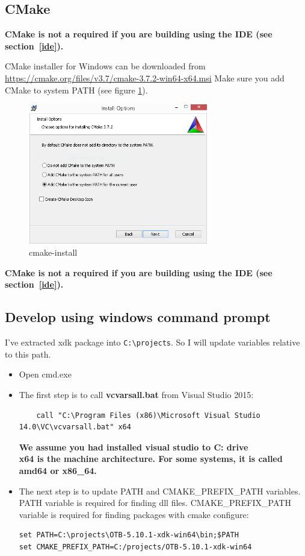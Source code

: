 \documentclass[10pt,a4paper]{article}
\begin{document}
\subsection{CMake}

\textbf{CMake is not a required if you are building using the IDE (see section~\ref{ide}).}

CMake installer for Windows can be downloaded from \url{https://cmake.org/files/v3.7/cmake-3.7.2-win64-x64.msi}
\newline
Make sure you add CMake to system PATH (see figure \ref{fig:cmake-install}).

\begin{figure}[!htbp]
  \center
  \includegraphics[width=0.7\textwidth]{Art/cmake-install.png}
  \caption[]{cmake-install}
  \label{fig:cmake-install}
\end{figure}

\textbf{CMake is not a required if you are building using the IDE (see section~\ref{ide}).}

\subsection{Develop using windows command prompt}
I've extracted xdk package into \texttt{C:{\textbackslash}projects}. So I will
update variables relative to this path.

\begin{itemize}
  \item Open cmd.exe
  \item The first step is to call \textbf{vcvarsall.bat} from Visual Studio 2015:
  \begin{verbatim}
    call "C:\Program Files (x86)\Microsoft Visual Studio 14.0\VC\vcvarsall.bat" x64
  \end{verbatim}
  \textbf{We assume you had installed visual studio to C: drive} \\
  \textbf{x64 is the machine architecture. For some systems, it is called amd64 or
  x86\_64.}
  \item The next step is to update PATH and CMAKE\_PREFIX\_PATH variables. PATH variable
is required for finding dll files. CMAKE\_PREFIX\_PATH variable is required for
finding packages with cmake configure:
\begin{verbatim}
set PATH=C:\projects\OTB-5.10.1-xdk-win64\bin;$PATH
set CMAKE_PREFIX_PATH=C:/projects/OTB-5.10.1-xdk-win64
\end{verbatim}

\end{itemize}
  
\end{document}

